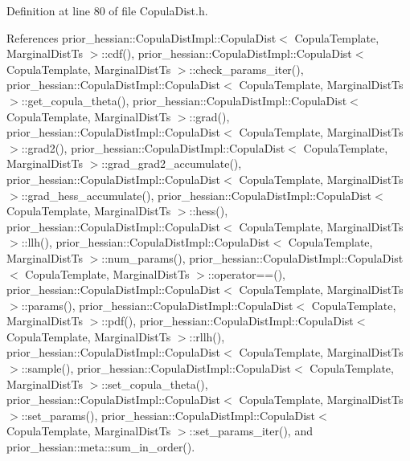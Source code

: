 Definition at line 80 of file Copula\+Dist.\+h.



References prior\+\_\+hessian\+::\+Copula\+Dist\+Impl\+::\+Copula\+Dist$<$ Copula\+Template, Marginal\+Dist\+Ts $>$\+::cdf(), prior\+\_\+hessian\+::\+Copula\+Dist\+Impl\+::\+Copula\+Dist$<$ Copula\+Template, Marginal\+Dist\+Ts $>$\+::check\+\_\+params\+\_\+iter(), prior\+\_\+hessian\+::\+Copula\+Dist\+Impl\+::\+Copula\+Dist$<$ Copula\+Template, Marginal\+Dist\+Ts $>$\+::get\+\_\+copula\+\_\+theta(), prior\+\_\+hessian\+::\+Copula\+Dist\+Impl\+::\+Copula\+Dist$<$ Copula\+Template, Marginal\+Dist\+Ts $>$\+::grad(), prior\+\_\+hessian\+::\+Copula\+Dist\+Impl\+::\+Copula\+Dist$<$ Copula\+Template, Marginal\+Dist\+Ts $>$\+::grad2(), prior\+\_\+hessian\+::\+Copula\+Dist\+Impl\+::\+Copula\+Dist$<$ Copula\+Template, Marginal\+Dist\+Ts $>$\+::grad\+\_\+grad2\+\_\+accumulate(), prior\+\_\+hessian\+::\+Copula\+Dist\+Impl\+::\+Copula\+Dist$<$ Copula\+Template, Marginal\+Dist\+Ts $>$\+::grad\+\_\+hess\+\_\+accumulate(), prior\+\_\+hessian\+::\+Copula\+Dist\+Impl\+::\+Copula\+Dist$<$ Copula\+Template, Marginal\+Dist\+Ts $>$\+::hess(), prior\+\_\+hessian\+::\+Copula\+Dist\+Impl\+::\+Copula\+Dist$<$ Copula\+Template, Marginal\+Dist\+Ts $>$\+::llh(), prior\+\_\+hessian\+::\+Copula\+Dist\+Impl\+::\+Copula\+Dist$<$ Copula\+Template, Marginal\+Dist\+Ts $>$\+::num\+\_\+params(), prior\+\_\+hessian\+::\+Copula\+Dist\+Impl\+::\+Copula\+Dist$<$ Copula\+Template, Marginal\+Dist\+Ts $>$\+::operator==(), prior\+\_\+hessian\+::\+Copula\+Dist\+Impl\+::\+Copula\+Dist$<$ Copula\+Template, Marginal\+Dist\+Ts $>$\+::params(), prior\+\_\+hessian\+::\+Copula\+Dist\+Impl\+::\+Copula\+Dist$<$ Copula\+Template, Marginal\+Dist\+Ts $>$\+::pdf(), prior\+\_\+hessian\+::\+Copula\+Dist\+Impl\+::\+Copula\+Dist$<$ Copula\+Template, Marginal\+Dist\+Ts $>$\+::rllh(), prior\+\_\+hessian\+::\+Copula\+Dist\+Impl\+::\+Copula\+Dist$<$ Copula\+Template, Marginal\+Dist\+Ts $>$\+::sample(), prior\+\_\+hessian\+::\+Copula\+Dist\+Impl\+::\+Copula\+Dist$<$ Copula\+Template, Marginal\+Dist\+Ts $>$\+::set\+\_\+copula\+\_\+theta(), prior\+\_\+hessian\+::\+Copula\+Dist\+Impl\+::\+Copula\+Dist$<$ Copula\+Template, Marginal\+Dist\+Ts $>$\+::set\+\_\+params(), prior\+\_\+hessian\+::\+Copula\+Dist\+Impl\+::\+Copula\+Dist$<$ Copula\+Template, Marginal\+Dist\+Ts $>$\+::set\+\_\+params\+\_\+iter(), and prior\+\_\+hessian\+::meta\+::sum\+\_\+in\+\_\+order().



